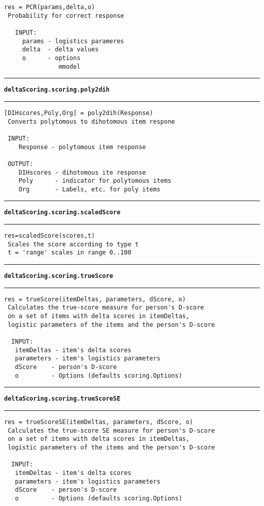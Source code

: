 \begin{lstlisting}[style=Matlab-bw]
 res = PCR(params,delta,o)
 Probability for correct response

   INPUT:
     params - logistics parameres
     delta  - delta values
     o      - options
               mmodel
\end{lstlisting}
\par\noindent\rule{\textwidth}{0.4pt}
{\bf\tt deltaScoring.scoring.poly2dih}
\par\noindent\rule{\textwidth}{0.4pt}
\begin{lstlisting}[style=Matlab-bw]
 [DIHscores,Poly,Org] = poly2dih(Response)
 Converts polytomous to dihotomous item respone

 INPUT:
	Response - polytomous item response

 OUTPUT:
	DIHscores - dihotomous ite response
	Poly      - indicator for polytomous items
	Org       - Labels, etc. for poly items
\end{lstlisting}
\par\noindent\rule{\textwidth}{0.4pt}
{\bf\tt deltaScoring.scoring.scaledScore}
\par\noindent\rule{\textwidth}{0.4pt}
\begin{lstlisting}[style=Matlab-bw]
 res=scaledScore(scores,t)
 Scales the score according to type t
 t = 'range' scales in range 0..100
\end{lstlisting}
\par\noindent\rule{\textwidth}{0.4pt}
{\bf\tt deltaScoring.scoring.trueScore}
\par\noindent\rule{\textwidth}{0.4pt}
\begin{lstlisting}[style=Matlab-bw]
 res = trueScore(itemDeltas, parameters, dScore, o)
 Calculates the true-score measure for person's D-score
 on a set of items with delta scores in itemDeltas,
 logistic parameters of the items and the person's D-score

  INPUT:
   itemDeltas - item's delta scores
   parameters - item's logistics parameters
   dScore    - person's D-score
   o         - Options (defaults scoring.Options)
\end{lstlisting}
\par\noindent\rule{\textwidth}{0.4pt}
{\bf\tt deltaScoring.scoring.trueScoreSE}
\par\noindent\rule{\textwidth}{0.4pt}
\begin{lstlisting}[style=Matlab-bw]
 res = trueScoreSE(itemDeltas, parameters, dScore, o)
 Calculates the true-score SE measure for person's D-score
 on a set of items with delta scores in itemDeltas,
 logistic parameters of the items and the person's D-score

  INPUT:
   itemDeltas - item's delta scores
   parameters - item's logistics parameters
   dScore    - person's D-score
   o         - Options (defaults scoring.Options)
\end{lstlisting}
